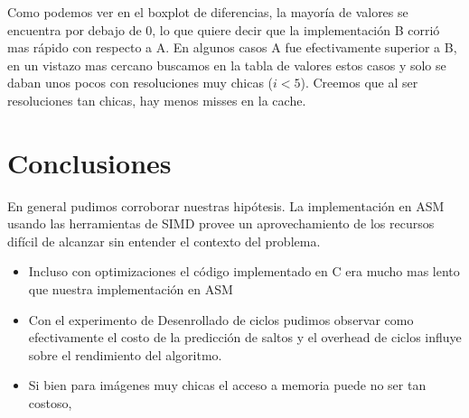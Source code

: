 \documentclass[a4paper]{article}
\begin{document}
Como podemos ver en el boxplot de diferencias, la mayoría de valores se encuentra por debajo de 0, lo que quiere decir que la implementaci\'on B corrió mas rápido con respecto a A. En algunos casos A fue efectivamente superior a B, en un vistazo mas cercano buscamos en la tabla de valores estos casos y solo se daban unos pocos con resoluciones muy chicas ($i < 5$). Creemos que al ser resoluciones tan chicas, hay menos misses en la cache.

\section{Conclusiones}
En general pudimos corroborar nuestras hip\'otesis. La implementaci\'on en ASM usando las herramientas de SIMD provee un aprovechamiento de los recursos difícil de alcanzar sin entender el contexto del problema.


\begin{itemize}
	\item Incluso con optimizaciones el código implementado en C era mucho mas lento que nuestra implementación en ASM 
	\item Con el experimento de Desenrollado de ciclos pudimos observar como efectivamente el costo de la predicci\'on de saltos y el overhead de ciclos influye sobre el rendimiento del algoritmo.
	\item Si bien para imágenes muy chicas el acceso a memoria puede no ser tan costoso, 
\end{itemize}
\end{document}
